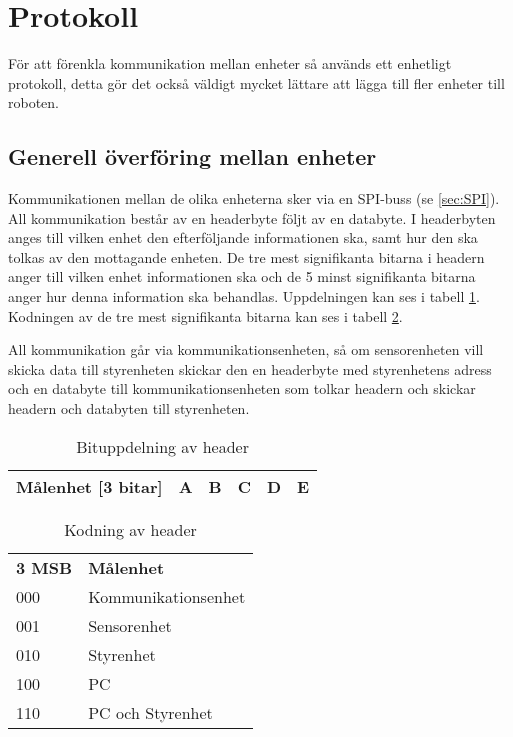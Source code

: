 
%
%
 
\section{Protokoll}
\label{sec:protokoll}

För att förenkla kommunikation mellan enheter så används ett enhetligt
protokoll, detta gör det också väldigt mycket lättare att lägga till fler
enheter till roboten.


\subsection{Generell överföring mellan enheter}
Kommunikationen mellan de olika enheterna sker via en SPI-buss (se 
\ref{sec:SPI}).
All kommunikation består av en headerbyte följt av en databyte.
I headerbyten anges till vilken enhet den efterföljande informationen ska, 
samt hur den ska tolkas av den mottagande enheten.
De tre mest signifikanta bitarna i headern anger till vilken enhet 
informationen ska och de 5 minst signifikanta bitarna anger 
hur denna information ska behandlas. Uppdelningen kan ses i tabell 
\ref{tab:header}.  Kodningen av de tre mest signifikanta bitarna kan ses i 
tabell \ref{tab:headerkod}.

All kommunikation går via kommunikationsenheten, så om sensorenheten vill 
skicka data till styrenheten skickar den en headerbyte med styrenhetens adress 
och en databyte till kommunikationsenheten som 
tolkar headern och skickar headern och databyten till styrenheten.
\begin{table}[h]
  \centering
  \begin{tabular}{| c | c | c | c | c | c |}
    \hline
    Målenhet [3 bitar] & A & B & C & D & E \\
    \hline
  \end{tabular}
  \caption{Bituppdelning av header}
  \label{tab:header}
\end{table}

\begin{table}[h]
  \centering
  \begin{tabular}{l l}
    \textbf{3 MSB} & \textbf{Målenhet} \\
    000 & Kommunikationsenhet \\
    001 & Sensorenhet \\
    010 & Styrenhet \\
    100 & PC \\
    110 & PC och Styrenhet\\
  \end{tabular}
  \caption{Kodning av header}
  \label{tab:headerkod}
\end{table}



